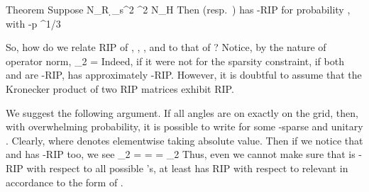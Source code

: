 \Result
{Theorem}
{
Suppose
%
 {
\NC N_R
\geq \NC {} {\d_s^2} ^2 \log N_H \NR
}
%
Then  (resp.\ ) has -RIP for probability , with
 {
 -p
\leq \NC {} ^{1/3} \NR
}
}

\stopsubsection

\startsubsection [title={Confirming the Restricted Isometry}]

So, how do we relate RIP of , , , and  to that of ?
Notice, by the nature of operator norm,
 {
\NC {} _2
=\NC {}  \NR
}
Indeed, if it were not for the sparsity constraint, if both  and  are -RIP,  has approximately -RIP.
However, it is doubtful to assume that the Kronecker product of two RIP matrices exhibit RIP.

We suggest the following argument.
If all angles  are on exactly on the grid, then, with overwhelming probability, it is possible to write
for some -sparse  and unitary .
Clearly,
where  denotes elementwise taking absolute value.
Then if we notice that  and  has -RIP too, we see
 {
\NC \NC {} _2 \NR
%
\NC =\NC {} \NR
%
\NC =\NC {} \NR
%
\NC =\NC {} \D
    \NR
%
\NC \eqsim \NC {} _2  \NR
}
Thus, even we cannot make sure that  is -RIP with respect to all possible 's, at least  has RIP with respect to relevant  in accordance to the form of .

\stopsubsection

\stopsection
